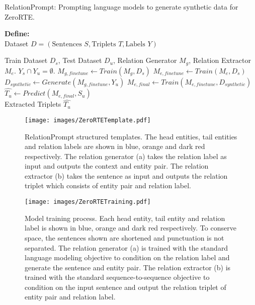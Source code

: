\documentclass[11pt]{article}
\begin{document}
\begin{algorithm}
\caption{RelationPrompt: Prompting language models to generate synthetic data for ZeroRTE.}
\label{alg:cap}
\textbf{Define:} \\
Dataset $D = (\textrm{Sentences } S, \textrm{Triplets } T, \textrm{Labels } Y)$
\begin{algorithmic}[1]
\Require
Train Dataset $D_s$,
Test Dataset $D_u$,
Relation Generator $M_g$, 
Relation Extractor $M_e$.
\Ensure $Y_{s} \cap Y_{u} = \emptyset$.
\State $M_{g, finetune} \gets Train(M_g, D_s)$
\State $M_{e, finetune} \gets Train(M_e, D_s)$
\State $D_{synthetic} \gets Generate(M_{g, finetune}, Y_u)$
\State $M_{e, final} \gets Train(M_{e, finetune}, D_{synthetic})$
\State $\hat{T_{u}} \gets Predict(M_{e, final}, S_u)$
\\ \Return Extracted Triplets $\hat{T_{u}}$
\end{algorithmic}
\end{algorithm}





\begin{figure}[!t]
\centering
\texttt{[image: images/ZeroRTETemplate.pdf]}
\caption{
RelationPrompt structured templates.
The head entities, tail entities and relation labels are shown in blue, orange and dark red respectively.
The relation generator (a) takes the relation label as input and outputs the context and entity pair.
The relation extractor (b) takes the sentence as input and outputs the relation triplet which consists of entity pair and relation label. 
}
\label{fig:template}
\end{figure}


\begin{figure*}[!t]
\centering
\texttt{[image: images/ZeroRTETraining.pdf]}
\caption{
    Model training process. 
    Each head entity, tail entity and relation label is shown in blue, orange and dark red respectively.
    To conserve space, the sentences shown are shortened and punctuation is not separated.
The relation generator (a) is trained with the standard language modeling objective to condition on the relation label and generate the sentence and entity pair.
    The relation extractor (b) is trained with the standard sequence-to-sequence objective to condition on the input sentence and output the relation triplet of entity pair and relation label.
}
\label{fig:training}
\end{figure*}
\end{document}
